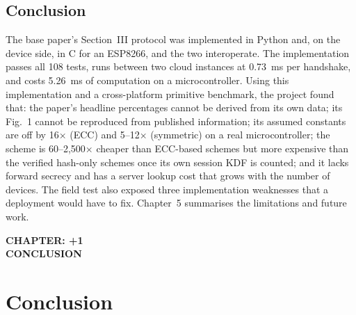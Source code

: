 \documentclass[12pt,a4paper,oneside]{report}
\numberwithin{equation}{chapter}
\newcommand{\ChapterDivider}[1]{%
  \clearpage\thispagestyle{empty}\null\vfill
  \begin{center}{\large\bfseries CHAPTER: \number\numexpr\value{chapter}+1\relax}\\[1.2in]{\large\bfseries\MakeUppercase{#1}}\end{center}
  \vfill\null\clearpage}
\begin{document}
\section{Conclusion}
The base paper's Section~III protocol was implemented in Python and, on the device side, in C for an ESP8266, and the two interoperate. The implementation passes all 108 tests, runs between two cloud instances at 0.73~ms per handshake, and costs 5.26~ms of computation on a microcontroller. Using this implementation and a cross-platform primitive benchmark, the project found that: the paper's headline percentages cannot be derived from its own data; its Fig.~1 cannot be reproduced from published information; its assumed constants are off by 16$\times$ (ECC) and 5--12$\times$ (symmetric) on a real microcontroller; the scheme is 60--2{,}500$\times$ cheaper than ECC-based schemes but more expensive than the verified hash-only schemes once its own session KDF is counted; and it lacks forward secrecy and has a server lookup cost that grows with the number of devices. The field test also exposed three implementation weaknesses that a deployment would have to fix. Chapter~5 summarises the limitations and future work.

\ChapterDivider{Conclusion}
\chapter{Conclusion}
\end{document}
